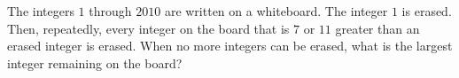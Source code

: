 The integers $1$ through $2010$ are written on a whiteboard. The integer $1$ is erased. Then, repeatedly, every integer on the board that is $7$ or $11$ greater than an erased integer is erased. When no more integers can be erased, what is the largest integer remaining on the board?

